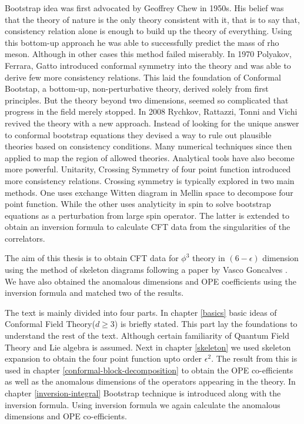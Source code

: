 \documentclass[12pt,a4paper,oneside]{book}
\theoremstyle{definition}
\begin{document}
            Bootstrap idea was first advocated by Geoffrey Chew in 1950s. His belief was that the theory of nature is the only theory consistent with it, that is to say that, consistency relation alone is enough to build up the theory of everything. Using this bottom-up approach he was able to successfully predict the mass of rho meson. Although in other cases this method failed miserably. In 1970 Polyakov\cite{polyakov}, Ferrara, Gatto introduced conformal symmetry into the theory and was able to derive few more consistency relations. This laid the foundation of Conformal Bootstap, a bottom-up, non-perturbative theory, derived solely from first principles. But the theory beyond two dimensions, seemed so complicated that progress in the field merely stopped. In 2008 Rychkov, Rattazzi, Tonni and Vichi\cite{rychkov} revived the theory with a new approach. Instead of looking for the unique answer to conformal bootstrap equations they devised a way to rule out plausible theories based on consistency conditions. Many numerical techniques since then applied to map the region of allowed theories. Analytical tools have also become more powerful. Unitarity, Crossing Symmetry of four point function introduced more consistency relations. Crossing symmetry is typically explored in two main methods. One uses exchange Witten diagram in Mellin space\cite{aninda} to decompose four point function. While the other uses analyticity in spin  to solve bootstrap equations as a perturbation from large spin operator. The latter is extended to obtain an inversion formula\cite{inversiongravitation} to calculate CFT data from the singularities of the correlators.\par
            The aim of this thesis is to obtain CFT data for $\phi^3$ theory in $(6-\epsilon)$ dimension using the method of skeleton diagrams following a paper by Vasco Goncalves \cite{vasco}. We have also obtained the anomalous dimensions and OPE coefficients using the inversion formula and matched two of the results. \par
            The text is mainly divided into four parts. In chapter \ref{basics} basic ideas of Conformal Field Theory($d\geq3$) is briefly stated. This part lay the foundations to understand the rest of the text. Although certain familiarity of Quantum Field Theory and Lie algebra is assumed. Next in chapter \ref{skeleton} we used skeleton expansion to obtain the four point function upto order $\epsilon^2$. The result from this is used in chapter \ref{conformal-block-decomposition} to obtain the OPE co-efficients as well as the anomalous dimensions of the operators appearing in the theory. In chapter \ref{inversion-integral} Bootstrap technique is introduced along with the inversion formula. Using inversion formula we again calculate the anomalous dimensions and OPE co-efficients.
\end{document}
